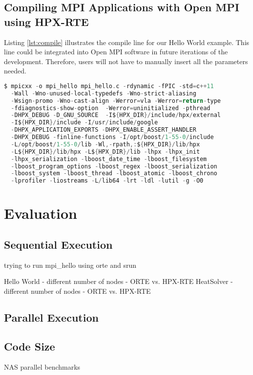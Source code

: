 \subsection{Compiling MPI Applications with Open MPI using HPX-RTE}
Listing \ref{lst:compile} illustrates the compile line for our Hello World example. This line could be integrated into Open MPI software in future iterations of the development. Therefore, users will not have to manually insert all the parameters needed.

\begin{lstlisting}[language=C, frame=single, basicstyle=\footnotesize, caption=Compile Line for Hello World\label{lst:compile}]
  $ mpicxx -o mpi_hello mpi_hello.c -rdynamic -fPIC -std=c++11
  -Wall -Wno-unused-local-typedefs -Wno-strict-aliasing
  -Wsign-promo -Wno-cast-align -Werror=vla -Werror=return-type
  -fdiagnostics-show-option  -Werror=uninitialized -pthread
  -DHPX_DEBUG -D_GNU_SOURCE  -I${HPX_DIR}/include/hpx/external
  -I${HPX_DIR}/include -I/usr/include/google
  -DHPX_APPLICATION_EXPORTS -DHPX_ENABLE_ASSERT_HANDLER
  -DHPX_DEBUG -finline-functions -I/opt/boost/1-55-0/include
  -L/opt/boost/1-55-0/lib -Wl,-rpath,:${HPX_DIR}/lib/hpx
  -L${HPX_DIR}/lib/hpx -L${HPX_DIR}/lib -lhpx -lhpx_init
  -lhpx_serialization -lboost_date_time -lboost_filesystem
  -lboost_program_options -lboost_regex -lboost_serialization
  -lboost_system -lboost_thread -lboost_atomic -lboost_chrono
  -lprofiler -liostreams -L/lib64 -lrt -ldl -lutil -g -O0
\end{lstlisting}


\section{Evaluation}

\subsection{Sequential Execution}
trying to run mpi_hello using orte and srun

Hello World - different number of nodes - ORTE vs. HPX-RTE
HeatSolver - different number of nodes - ORTE vs. HPX-RTE



\subsection{Parallel Execution}

\subsection{Code Size}

NAS parallel benchmarks~\cite{bailey1991parallel}
